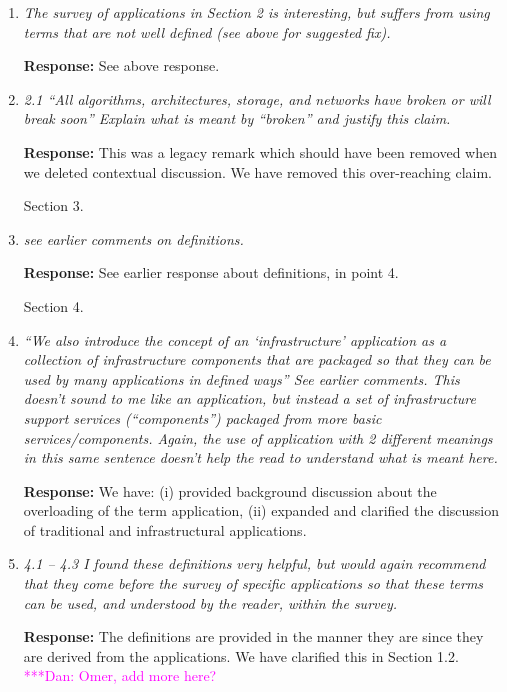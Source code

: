 \documentclass{article}
\newcommand{\katznote}[1]{{\textcolor{magenta} { ***Dan: #1 }}}
\newcommand{\katznote}[1]{}
\begin{document}
\begin{enumerate}
\item \emph{The survey of applications in Section 2 is interesting, but suffers from using terms that are not well defined (see above for suggested fix).}

\textbf{Response:} See above response.

\item \emph{2.1 ``All algorithms, architectures, storage, and networks have broken or will break soon'' Explain what is meant by ``broken'' and justify this claim.} 

  \textbf{Response:} This was a legacy remark which should have been removed when we deleted contextual discussion. We have removed this over-reaching claim.

\hspace{-0.7cm}Section 3. 

\item \emph{see earlier comments on definitions.} 

\textbf{Response:} See earlier response about definitions, in point 4.

\hspace{-0.7cm}Section 4. 

\item \emph{``We also introduce the concept of an `infrastructure' application as a collection of infrastructure components that are packaged so that they can be used by many applications in defined ways'' See earlier comments. This doesn't sound to me like an application, but instead a set of infrastructure support services (``components'') packaged from more basic services/components. Again, the use of application with 2 different meanings in this same sentence doesn't help the read to understand what is meant here.}

  \textbf{Response:} We have: (i) provided background discussion about the overloading of the term application, (ii) expanded and clarified the discussion of traditional and infrastructural applications.

\item \emph{4.1 -- 4.3 I found these definitions very helpful, but would again recommend that they come before the survey of specific applications so that these terms can be used, and understood by the reader, within the survey.}

  \textbf{Response:} 
The definitions are provided in the manner they are since they are derived from the applications.  We have clarified this in Section 1.2.  \katznote{Omer, add more here?}



\end{enumerate}

\end{document}
